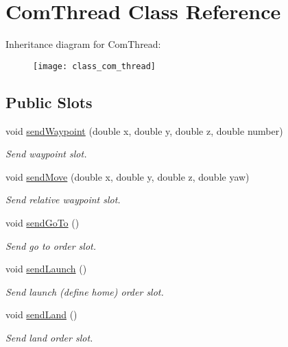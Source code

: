 \hypertarget{class_com_thread}{\section{Com\-Thread Class Reference}
\label{class_com_thread}
}
Inheritance diagram for Com\-Thread\-:\begin{figure}[H]
\begin{center}
\leavevmode
\texttt{[image: class\_com\_thread]}
\end{center}
\end{figure}
\subsection*{Public Slots}
\begin{DoxyCompactItemize}
\item 
void \hyperlink{class_com_thread_adbaa9d0f6ef504d9b3fdb0adc3c38fa4}{send\-Waypoint} (double x, double y, double z, double number)
\begin{DoxyCompactList}\small\item\em Send waypoint slot. \end{DoxyCompactList}\item 
void \hyperlink{class_com_thread_a6e177274e563316924bf02724e18afa5}{send\-Move} (double x, double y, double z, double yaw)
\begin{DoxyCompactList}\small\item\em Send relative waypoint slot. \end{DoxyCompactList}\item 
void \hyperlink{class_com_thread_ade0627af051e02bc3ffedc745bf2f3d3}{send\-Go\-To} ()
\begin{DoxyCompactList}\small\item\em Send go to order slot. \end{DoxyCompactList}\item 
void \hyperlink{class_com_thread_ac80e7f519d40afdb97ea3d5295bdde2d}{send\-Launch} ()
\begin{DoxyCompactList}\small\item\em Send launch (define home) order slot. \end{DoxyCompactList}\item 
void \hyperlink{class_com_thread_ac7fc3760cac1918a70f3bf229d1331a6}{send\-Land} ()
\begin{DoxyCompactList}\small\item\em Send land order slot. \end{DoxyCompactList}\item 

\end{DoxyCompactItemize}
